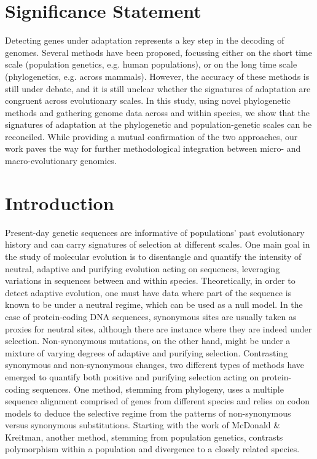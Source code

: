 \documentclass{article}
\begin{document}
    \section*{Significance Statement}
    Detecting genes under adaptation represents a key step in the decoding of genomes.
    Several methods have been proposed, focussing either on the short time scale (population genetics, e.g. human populations), or on the long time scale (phylogenetics, e.g. across mammals).
    However, the accuracy of these methods is still under debate, and it is still unclear whether the signatures of adaptation are congruent across evolutionary scales.
    In this study, using novel phylogenetic methods and gathering genome data across and within species, we show that the signatures of adaptation at the phylogenetic and population-genetic scales can be reconciled.
    While providing a mutual confirmation of the two approaches, our work paves the way for further methodological integration between micro- and macro-evolutionary genomics.

    \section*{Introduction}
    Present-day genetic sequences are informative of populations' past evolutionary history and can carry signatures of selection at different scales.
    One main goal in the study of molecular evolution is to disentangle and quantify the intensity of neutral, adaptive and purifying evolution acting on sequences, leveraging variations in sequences between and within species.
    Theoretically, in order to detect adaptive evolution, one must have data where part of the sequence is known to be under a neutral regime, which can be used as a null model.
    In the case of protein-coding DNA sequences, synonymous sites are usually taken as proxies for neutral sites, although there are instance where they are indeed under selection\cite{duret_expression_1999, duret_evolution_2002, galtier_codon_2018}.
    Non-synonymous mutations, on the other hand, might be under a mixture of varying degrees of adaptive and purifying selection.
    Contrasting synonymous and non-synonymous changes, two different types of methods have emerged to quantify both positive and purifying selection acting on protein-coding sequences.
    One method, stemming from phylogeny, uses a multiple sequence alignment comprised of genes from different species and relies on codon models to deduce the selective regime from the patterns of non-synonymous versus synonymous substitutions\cite{muse_likelihood_1994,goldman_codonbased_1994}.
    Starting with the work of McDonald \& Kreitman\cite{mcdonald_adaptative_1991}, another method, stemming from population genetics, contrasts polymorphism within a population and divergence to a closely related species.
\end{document}
